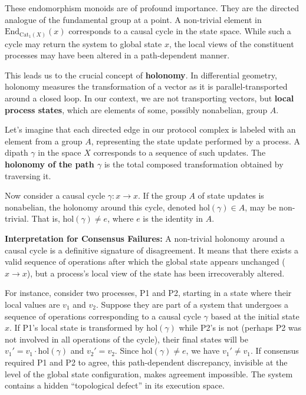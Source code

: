 \documentclass[
]{article}
\begin{document}
These endomorphism monoids are of profound importance. They are the
directed analogue of the fundamental group at a point. A non-trivial
element in \(\text{End}_{\text{Cat}_1(X)}(x)\) corresponds to a causal
cycle in the state space. While such a cycle may return the system to
global state \(x\), the local views of the constituent processes may
have been altered in a path-dependent manner.

This leads us to the crucial concept of \textbf{holonomy}. In
differential geometry, holonomy measures the transformation of a vector
as it is parallel-transported around a closed loop. In our context, we
are not transporting vectors, but \textbf{local process states}, which
are elements of some, possibly nonabelian, group \(A\).

Let's imagine that each directed edge in our protocol complex is labeled
with an element from a group \(A\), representing the state update
performed by a process. A dipath \(\gamma\) in the space \(X\)
corresponds to a sequence of such updates. The \textbf{holonomy of the
path \(\gamma\)} is the total composed transformation obtained by
traversing it.

Now consider a causal cycle \(\gamma: x \to x\). If the group \(A\) of
state updates is nonabelian, the holonomy around this cycle, denoted
\(\text{hol}(\gamma) \in A\), may be non-trivial. That is,
\(\text{hol}(\gamma) \neq e\), where \(e\) is the identity in \(A\).

\textbf{Interpretation for Consensus Failures:} A non-trivial holonomy
around a causal cycle is a definitive signature of disagreement. It
means that there exists a valid sequence of operations after which the
global state appears unchanged (\(x \to x\)), but a process's local view
of the state has been irrecoverably altered.

For instance, consider two processes, P1 and P2, starting in a state
where their local values are \(v_1\) and \(v_2\). Suppose they are part
of a system that undergoes a sequence of operations corresponding to a
causal cycle \(\gamma\) based at the initial state \(x\). If P1's local
state is transformed by \(\text{hol}(\gamma)\) while P2's is not
(perhaps P2 was not involved in all operations of the cycle), their
final states will be \(v_1' = v_1 \cdot \text{hol}(\gamma)\) and
\(v_2' = v_2\). Since \(\text{hol}(\gamma) \neq e\), we have
\(v_1' \neq v_1\). If consensus required P1 and P2 to agree, this
path-dependent discrepancy, invisible at the level of the global state
configuration, makes agreement impossible. The system contains a hidden
``topological defect'' in its execution space.
\end{document}
